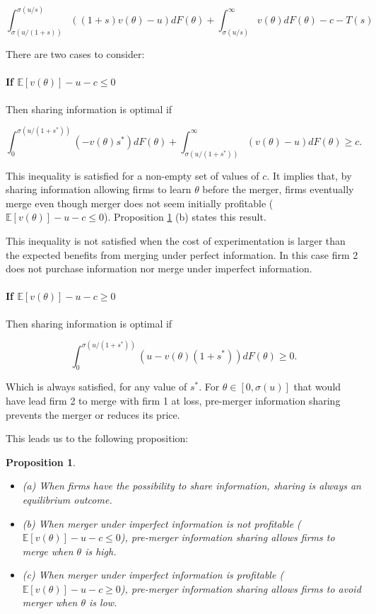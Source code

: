 \documentclass[a4paper,leqno]{article}%
\newtheorem{prop}{Proposition}
\newcommand{\E}{\mathbb E}
\renewcommand{\t}{\theta}
\newcommand{\s}{\sigma}
\begin{document}
\[
\int_{\s(u/(1+s))}^{\s(u/s)} ((1+s)v(\t)-u)dF(\t)+\int_{\s(u/s)}^\infty v(\t)dF(\t)-c-T(s)
\]

\medskip

There are two cases to consider:

\paragraph{If $\E[v(\t)]-u-c\leq 0$}

Then sharing information is optimal if 

\[
\int_0^{\s(u/(1+s^*))}(-v(\t)s^*)dF(\t)+\int_{\s(u/(1+s^*))}^\infty (v(\t)-u)dF(\t)\geq c.
\]

This inequality is satisfied for a non-empty set of values of $c$. It implies that, by sharing information allowing firms to learn $\t$ before the merger, firms eventually merge even though merger does not seem initially profitable ($\E[v(\t)]-u-c\leq 0$). Proposition \ref{prop:1} (b) states this result.

This inequality is not satisfied when the cost of experimentation is larger than the expected benefits from merging under perfect information. In this case firm 2 does not purchase information nor merge under imperfect information. 

\paragraph{If $\E[v(\t)]-u-c\geq 0$}

Then sharing information is optimal if 

\[
\int_0^{\s(u/(1+s^*))}(u-v(\t)(1+s^*))dF(\t)\geq 0.
\]

Which is always satisfied, for any value of $s^*$. For $\t \in [0,\s(u)]$ that would have lead firm 2 to merge with firm 1 at loss, pre-merger information sharing prevents the merger or reduces its price.




This leads us to the following proposition:

\begin{prop}~~\label{prop:1}

\begin{itemize}
    \item (a) When firms have the possibility to share information, sharing is always an equilibrium outcome.
    \item (b) When merger under imperfect information is not profitable ($\E[v(\t)]-u-c\leq 0$), pre-merger information sharing allows firms to merge when $\t$ is high. 
    \item (c) When merger under imperfect information is profitable ($\E[v(\t)]-u-c\geq 0$), pre-merger information sharing allows firms to avoid merger when $\t$ is low.
\end{itemize} 

\end{prop}
\end{document}
